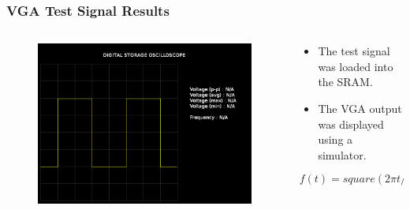 \documentclass{beamer}
\begin{document}
\begin{frame}
\frametitle{VGA Test Signal Results}

\begin{columns}[onlytextwidth]
  \begin{column}{0.5\linewidth}
  
    \begin{figure}[!htb]
      \includegraphics[width=\linewidth]{vga_test_signal2_results.png}
    \end{figure}
    
  \end{column}
  \begin{column}{0.45\linewidth}
  
    \begin{itemize}
      \item The test signal was loaded into the SRAM.
      \item The VGA output was displayed using a simulator.
    \end{itemize}
    
    \[ f(t) = square(2 \pi t / T) \]
    
  \end{column}
\end{columns}

\end{frame}
\end{document}
